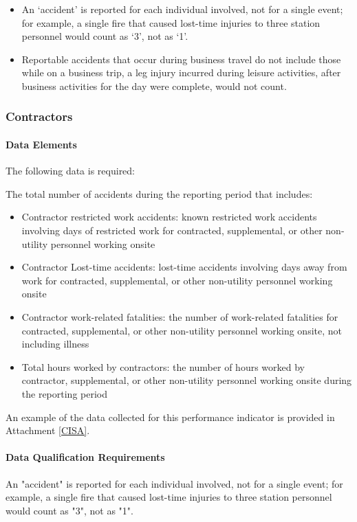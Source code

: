 \begin{itemize}
\item An ‘accident’ is reported for each individual involved, not for a single event; for example, a single fire that caused lost-time injuries to three station personnel would count as ‘3’, not as ‘1’.
\item Reportable accidents that occur during business travel do not
  include those while on a business trip, a leg injury incurred during
  leisure activities, after business activities for the day were
  complete, would not count.
\end{itemize}

\subsubsection{Contractors}
\paragraph{Data Elements}
The following data is required:

The total number of accidents during the reporting period that
includes:
\begin{itemize}
\item Contractor restricted work accidents: known restricted work accidents involving days of restricted work for contracted, supplemental, or other non-utility personnel working onsite
\item Contractor Lost-time accidents: lost-time accidents involving days away from work for contracted, supplemental, or other non-utility personnel working onsite
\item Contractor work-related fatalities: the number of work-related fatalities for contracted, supplemental, or other non-utility personnel working onsite, not including illness
\item Total hours worked by contractors: the number of hours worked by
  contractor, supplemental, or other non-utility personnel working
  onsite during the reporting period
\end{itemize}
An example of the data collected for this performance indicator is
provided in Attachment \ref{CISA}.

\paragraph{Data Qualification Requirements}

An "accident" is reported for each individual involved, not for a
single event; for example, a single fire that caused lost-time
injuries to three station personnel would count as "3", not as "1".

